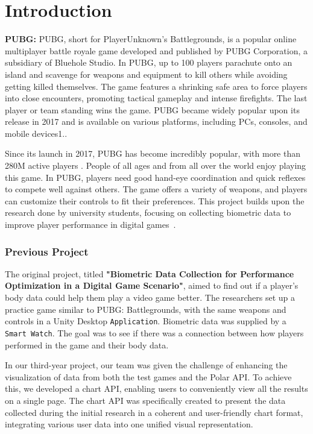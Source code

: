 \chapter{Introduction}

\par

\textbf{PUBG:} PUBG, short for PlayerUnknown's Battlegrounds, is a popular online multiplayer battle royale game developed and published by PUBG Corporation, a subsidiary of Bluehole Studio. In PUBG, up to 100 players parachute onto an island and scavenge for weapons and equipment to kill others while avoiding getting killed themselves. The game features a shrinking safe area to force players into close encounters, promoting tactical gameplay and intense firefights. The last player or team standing wins the game. PUBG became widely popular upon its release in 2017 and is available on various platforms, including PCs, consoles, and mobile devices1.\cite{PUBG}.
\par 
Since its launch in 2017, PUBG has become incredibly popular, with more than 280M active players \cite{PUBG_users}. People of all ages and from all over the world enjoy playing this game. In PUBG, players need good hand-eye coordination and quick reflexes to compete well against others. The game offers a variety of weapons, and players can customize their controls to fit their preferences. This project builds upon the research done by university students, focusing on collecting biometric data to improve player performance in digital games~\cite{PUBG}.

\subsection*{Previous Project}
The original project, titled \textbf{"Biometric Data Collection for Performance Optimization in a Digital Game Scenario"}, aimed to find out if a player's body data could help them play a video game better. The researchers set up a practice game similar to PUBG: Battlegrounds, with the same weapons and controls in a Unity Desktop {\tt Application}. Biometric data was supplied by a {\tt Smart Watch}. The goal was to see if there was a connection between how players performed in the game and their body data.

\par
In our third-year project, our team was given the challenge of enhancing the visualization of data from both the test games and the Polar API. To achieve this, we developed a chart API, enabling users to conveniently view all the results on a single page. The chart API was specifically created to present the data collected during the initial research in a coherent and user-friendly chart format, integrating various user data into one unified visual representation.

